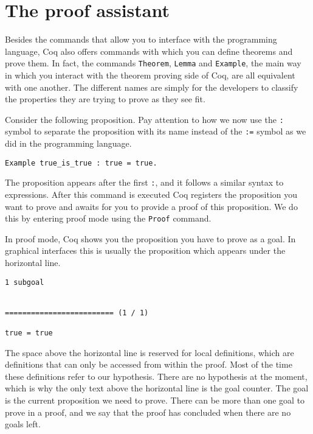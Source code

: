 \section{The proof assistant}
\label{sect:coq-proof-assistant}


Besides the commands that allow you to interface with the programming language, Coq also offers commands
with which you can define theorems and prove them. In fact, the commands \texttt{Theorem}, 
\texttt{Lemma} and \texttt{Example}, the main way in which you interact with the 
theorem proving side of Coq, are all equivalent with one another. The different names are simply for the 
developers to classify the properties they are trying to prove as they see fit.

Consider the following proposition. Pay attention to how we now use the \texttt{:} symbol to separate the 
proposition with its name instead of the \texttt{:=} symbol as we did in the programming language.

\begin{verbatim}
Example true_is_true : true = true.
\end{verbatim}

The proposition appears after the first \texttt{:}, and it follows a similar syntax to 
expressions. %
After this command is executed Coq registers the proposition you want to prove and awaits for you
to provide a proof of this proposition. We do this by entering proof mode using the 
\texttt{Proof} command.

In proof mode, Coq shows you the proposition you have to prove as a goal. In graphical interfaces this
is usually the proposition which appears under the horizontal line.

\begin{verbatim}
1 subgoal


========================= (1 / 1)

true = true
\end{verbatim}

The space above the horizontal line is reserved for local definitions, which are definitions that can
only be accessed from within the proof. Most of the time these definitions refer to our hypothesis. There
are no hypothesis at the moment, which is why the only text above the horizontal line is the goal counter.
The goal is the current proposition we need to prove. There can be more than one goal to prove in a proof,
and we say that the proof has concluded when there are no goals left.

